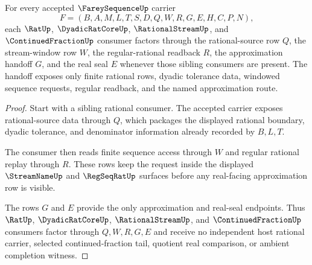 \begin{theorem}
\label{thm:farey-sequence-rational-source-handoff-scope}
For every accepted $\FareySequenceUp$ carrier
$$
F=(B,A,M,L,T,S,D,Q,W,R,G,E,H,C,P,N),
$$
each $\RatUp$, $\DyadicRatCoreUp$, $\RationalStreamUp$, and $\ContinuedFractionUp$ consumer factors through the rational-source row $Q$, the stream-window row $W$, the regular-rational readback $R$, the approximation handoff $G$, and the real seal $E$ whenever those sibling consumers are present. The handoff exposes only finite rational rows, dyadic tolerance data, windowed sequence requests, regular readback, and the named approximation route.
\end{theorem}
\begin{proof}
Start with a sibling rational consumer. The accepted carrier exposes rational-source data through $Q$, which packages the displayed rational boundary, dyadic tolerance, and denominator information already recorded by $B,L,T$.

The consumer then reads finite sequence access through $W$ and regular rational replay through $R$. These rows keep the request inside the displayed $\StreamNameUp$ and $\RegSeqRatUp$ surfaces before any real-facing approximation row is visible.

The rows $G$ and $E$ provide the only approximation and real-seal endpoints. Thus $\RatUp$, $\DyadicRatCoreUp$, $\RationalStreamUp$, and $\ContinuedFractionUp$ consumers factor through $Q,W,R,G,E$ and receive no independent host rational carrier, selected continued-fraction tail, quotient real comparison, or ambient completion witness.
\end{proof}

